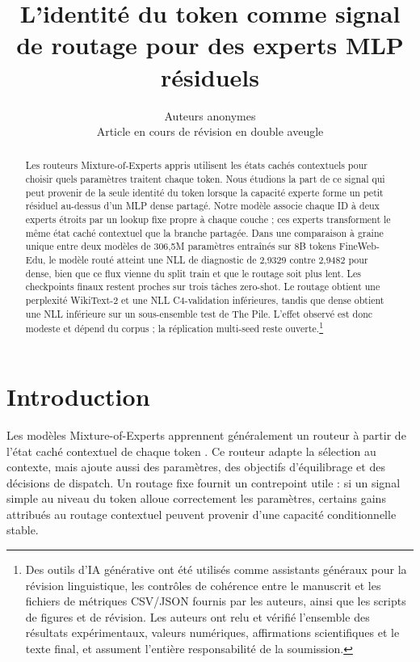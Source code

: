 \documentclass[10pt]{article}
\title{L'identit\'{e} du token comme signal de routage pour des experts MLP r\'{e}siduels}
\author{\name Auteurs anonymes \\
      \addr Article en cours de r\'{e}vision en double aveugle}
\theoremstyle{definition}
\theoremstyle{remark}
\begin{document}
\maketitle

\begin{abstract}
Les routeurs Mixture-of-Experts appris utilisent les \'{e}tats cach\'{e}s contextuels pour choisir quels param\`{e}tres traitent chaque token. Nous \'{e}tudions la part de ce signal qui peut provenir de la seule identit\'{e} du token lorsque la capacit\'{e} experte forme un petit r\'{e}siduel au-dessus d'un MLP dense partag\'{e}. Notre mod\`{e}le associe chaque ID \`{a} deux experts \'{e}troits par un lookup fixe propre \`{a} chaque couche ; ces experts transforment le m\^{e}me \'{e}tat cach\'{e} contextuel que la branche partag\'{e}e. Dans une comparaison \`{a} graine unique entre deux mod\`{e}les de 306,5M param\`{e}tres entra\^{i}n\'{e}s sur 8B tokens FineWeb-Edu, le mod\`{e}le rout\'{e} atteint une NLL de diagnostic de 2,9329 contre 2,9482 pour dense, bien que ce flux vienne du split train et que le routage soit plus lent. Les checkpoints finaux restent proches sur trois t\^{a}ches zero-shot. Le routage obtient une perplexit\'{e} WikiText-2 et une NLL C4-validation inf\'{e}rieures, tandis que dense obtient une NLL inf\'{e}rieure sur un sous-ensemble test de The Pile. L'effet observ\'{e} est donc modeste et d\'{e}pend du corpus ; la r\'{e}plication multi-seed reste ouverte.\footnote{Des outils d'IA g\'{e}n\'{e}rative ont \'{e}t\'{e} utilis\'{e}s comme assistants g\'{e}n\'{e}raux pour la r\'{e}vision linguistique, les contr\^{o}les de coh\'{e}rence entre le manuscrit et les fichiers de m\'{e}triques CSV/JSON fournis par les auteurs, ainsi que les scripts de figures et de r\'{e}vision. Les auteurs ont relu et v\'{e}rifi\'{e} l'ensemble des r\'{e}sultats exp\'{e}rimentaux, valeurs num\'{e}riques, affirmations scientifiques et le texte final, et assument l'enti\`{e}re responsabilit\'{e} de la soumission.}
\par
\end{abstract}

\section{Introduction}
\label{sec:introduction}

Les mod\`{e}les Mixture-of-Experts apprennent g\'{e}n\'{e}ralement un routeur \`{a} partir de l'\'{e}tat cach\'{e} contextuel de chaque token \citep{shazeer2017outrageously,fedus2022switch,jiang2024mixtral}. Ce routeur adapte la s\'{e}lection au contexte, mais ajoute aussi des param\`{e}tres, des objectifs d'\'{e}quilibrage et des d\'{e}cisions de dispatch. Un routage fixe fournit un contrepoint utile : si un signal simple au niveau du token alloue correctement les param\`{e}tres, certains gains attribu\'{e}s au routage contextuel peuvent provenir d'une capacit\'{e} conditionnelle stable.
\end{document}
